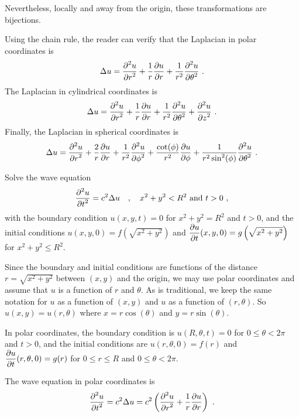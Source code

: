 Nevertheless, locally and away from the origin, these transformations
are bijections.

Using the chain rule, the reader can verify that the Laplacian in
polar coordinates is
\[
\Delta u = \frac{\displaystyle \partial^{2}{u}} {\displaystyle \partial r^{2}} + \frac{1}{r} \frac{\partial{u}}{\partial r}
+ \frac{1}{r^2} \frac{\displaystyle \partial^{2}{u}} {\displaystyle \partial \theta^{2}} \ .
\]
The Laplacian in cylindrical coordinates is
\[
\Delta u = \frac{\displaystyle \partial^{2}{u}} {\displaystyle \partial r^{2}} + \frac{1}{r} \frac{\partial{u}}{\partial r}
+ \frac{1}{r^2} \frac{\displaystyle \partial^{2}{u}} {\displaystyle \partial \theta^{2}} + \frac{\displaystyle \partial^{2}{u}} {\displaystyle \partial z^{2}} \ .
\]
Finally, the Laplacian in spherical coordinates is
\[
\Delta u = \frac{\displaystyle \partial^{2}{u}} {\displaystyle \partial r^{2}} + \frac{2}{r} \frac{\partial{u}}{\partial r}
+ \frac{1}{r^2} \frac{\displaystyle \partial^{2}{u}} {\displaystyle \partial \phi^{2}} + \frac{\cot(\phi)}{r^2}
\frac{\partial{u}}{\partial \phi} + \frac{1}{r^2\sin^2(\phi)}
\frac{\displaystyle \partial^{2}{u}} {\displaystyle \partial \theta^{2}} \ .
\]

\begin{egg}
Solve the wave equation
\[
\frac{\displaystyle \partial^{2}{u}} {\displaystyle \partial t^{2}} = c^2 \Delta u \quad , \quad x^2 + y^2  < R^2
\ \text{and} \ t > 0 \ , 
\]
with the boundary condition $u(x,y,t)=0$ for
$\displaystyle x^2 + y^2 = R^2$ and $t>0$, and the initial conditions
$\displaystyle u(x,y, 0) = f\left(\sqrt{x^2+y^2}\right)$ and
$\displaystyle \frac{\partial{u}}{\partial t}(x,y,0) = g\left(\sqrt{x^2+y^2}\right)$ for
$\displaystyle x^2 + y^2 \leq R^2$.

Since the boundary and initial conditions are functions of
the distance $r = \sqrt{x^2+y^2}$ between $(x,y)$ and the origin, we
may use polar coordinates and assume that $u$ is a function of $r$ and
$\theta$.  As is traditional, we keep the same notation for $u$ as a
function of $(x,y)$ and $u$ as a function of $(r,\theta)$.
So $u(x,y) = u(r,\theta)$ where $x = r\cos(\theta)$ and $y = r\sin(\theta)$.

In polar coordinates, the boundary condition is
$u(R,\theta,t)=0$ for $0 \leq \theta < 2\pi$ and $t >0$, and the
initial conditions are $\displaystyle u(r,\theta, 0) = f(r)$ and
$\displaystyle \frac{\partial{u}}{\partial t}(r,\theta,0) = g(r)$ for
$0 \leq r \leq R$ and $0\leq \theta < 2\pi$.

The wave equation in polar coordinates is
\begin{equation} \label{wave_spv_we_pc}
\pdydxn{u}{t}{2} = c^2 \Delta u =
c^2 \left( \pdydxn{u}{r}{2} + \frac{1}{r} \pdydx{u}{r}\right) \ .
\end{equation}


\end{egg}
